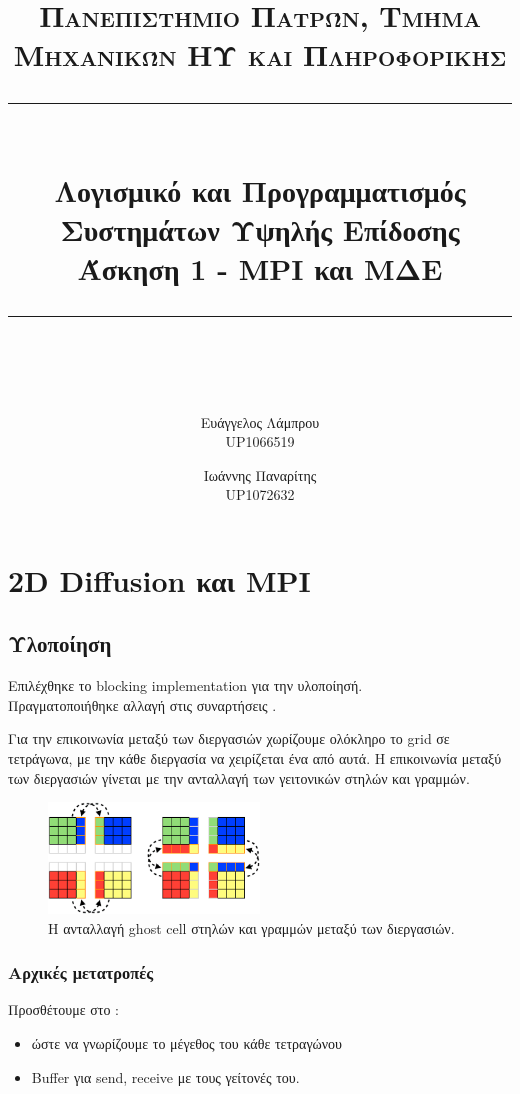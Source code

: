 \documentclass[11pt]{scrartcl} %
\title{	
	\normalfont\normalsize
	\textsc{Πανεπιστήμιο Πατρών, Τμήμα Μηχανικών ΗΥ και Πληροφορικής}\\ %
	\vspace{25pt} %
	\rule{\linewidth}{0.5pt}\\ %
	\vspace{20pt} %
	{\LARGE Λογισμικό και Προγραμματισμός Συστημάτων Υψηλής Επίδοσης\\ Άσκηση 1 - MPI και ΜΔΕ}\\ %
	\vspace{12pt} %
	\rule{\linewidth}{2pt}\\ %
	\vspace{12pt} %
}
\author{Ευάγγελος Λάμπρου \\UP1066519 \and Ιωάννης Παναρίτης \\UP1072632} %
\date{} %
\begin{document}
\maketitle 

\section{2D Diffusion και MPI}

    \subsection{Υλοποίηση}
        Επιλέχθηκε το blocking implementation για την υλοποίησή.\\
        Πραγματοποιήθηκε αλλαγή στις συναρτήσεις .

        Για την επικοινωνία μεταξύ των διεργασιών χωρίζουμε ολόκληρο το grid σε τετράγωνα, με την κάθε διεργασία να χειρίζεται ένα από αυτά.
        Η επικοινωνία μεταξύ των διεργασιών γίνεται με την ανταλλαγή των γειτονικών στηλών και γραμμών. \cite{ghostcellpattern}

        \begin{figure}[htpb]
            \centering
            \includegraphics[width=0.5\textwidth]{./assets/ghostcells.png}
            \caption{Η ανταλλαγή ghost cell στηλών και γραμμών μεταξύ των διεργασιών.}
        \end{figure}
        
        \subsubsection*{Αρχικές μετατροπές}
            Προσθέτουμε στο :
            \begin{itemize}
                \item {} ώστε να γνωρίζουμε το μέγεθος του κάθε τετραγώνου
                \item Buffer για send, receive με τους γείτονές του.
            \end{itemize}
            
\end{document}
